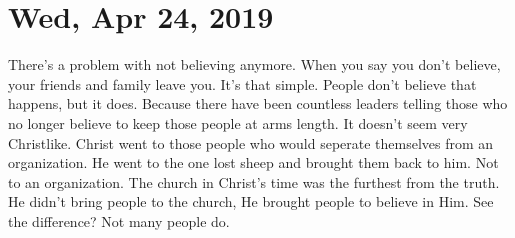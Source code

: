 \section{Wed, Apr 24, 2019}

There's a problem with not believing anymore. When you say you don't believe, 
your friends and family leave you. It's that simple. People don't believe that 
happens, but it does. Because there have been countless leaders telling those 
who no longer believe to keep those people at arms length. It doesn't seem very 
Christlike. Christ went to those people who would seperate themselves from an 
organization. He went to the one lost sheep and brought them back to him. Not to 
an organization. The church in Christ's time was the furthest from the truth. He 
didn't bring people to the church, He brought people to believe in Him. See the 
difference? Not many people do.
